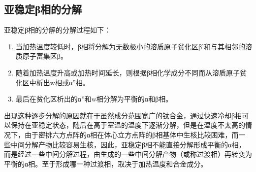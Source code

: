\subsection*{亚稳定β相的分解}
亚稳定β相的分解的分解过程如下：
\begin{enumerate}
	\item  当加热温度较低时，β相将分解为无数极小的溶质原子贫化区β'和与其相邻的溶质原子富集区β。
	\item  随着加热温度升高或加热时间延长，则根据β相化学成分不同而从溶质原子贫化区中析出w相或α”相。
	\item  最后在贫化区析出的α”和w相分解为平衡的α和β相。
\end{enumerate}

出现这种逐步分解的原因就在于虽然成分范围宽广的钛合金，通过快速冷却β相可以保持在亚稳定状态，随后在高于室温的温度下逐渐分解，但是在温度不太高的情况下，由于密排六方点阵的α相在体心立方点阵的β相基体中生核比较困难，而一些中间分解产物比较容易生核，因此，亚稳定β相不能直接分解形成平衡的α相，而是经过一些中间分解过程，由生成的一些中间分解产物（或称过渡相）再转变为平衡的α相。至于形成哪一种过渡相，取决于加热温度和合金成分。
%
%
%
%

